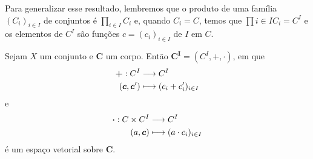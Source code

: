Para generalizar esse resultado, lembremos que o produto de uma família $(C_i)_{i \in I}$ de conjuntos é $\prod_{i \in I} C_i$ e, quando $C_i=C$, temos que $\prod{i \in I} C_i = C^I$ e os elementos de $C^I$ são funções $c=(c_i)_{i \in I}$ de $I$ em $C$.

\begin{prop}
Sejam $X$ um conjunto e $\bm C$ um corpo. Então $\bm {C^I}=(C^I,\bm +,\bm\cdot)$, em que
	\begin{align*}
	{\bm +}: {C^I} &\longrightarrow {C^I} \\{(\bm c,\bm c')} &\longmapsto {(c_i+c'_i)_{i \in I}}
	\end{align*}
e
	\begin{align*}
	{\bm\cdot}: {C \times C^I} &\longrightarrow {C^I} \\{(a,\bm c)} &\longmapsto {(a \cdot c_i)_{i \in I}}
	\end{align*}
é um espaço vetorial sobre $\bm C$.
\end{prop}

